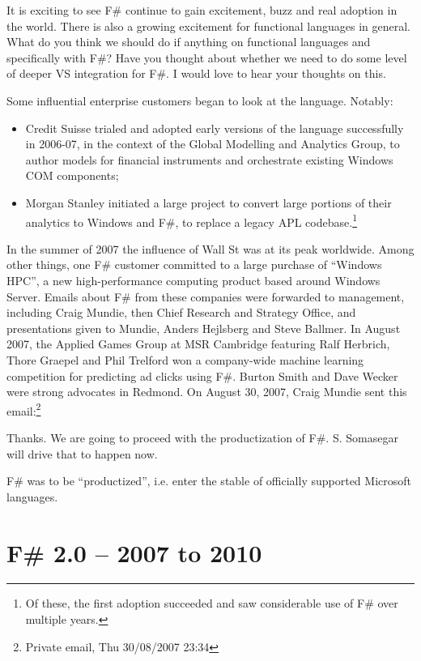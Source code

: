 \documentclass[acmsmall]{acmart}\settopmatter{}
\begin{document}
\begin{verbquote}
It is exciting to see F# continue to gain excitement, buzz and real adoption in the world. There is also a growing
excitement for functional languages in general. What do you think we should do if anything on functional languages
and specifically with F#?  Have you thought about whether we need to do some level of deeper VS integration for F#.  I would love to hear your thoughts on this.
\end{verbquote}
Some influential enterprise customers began to look at the language.  Notably:

\begin{itemize}
\item Credit Suisse trialed and adopted early versions of the language successfully in 2006-07, in the context
of the Global Modelling and Analytics Group, to author models for financial instruments and orchestrate existing Windows COM components;
\item Morgan Stanley initiated a large project to convert large portions of their analytics to Windows and F\#, to
replace a legacy APL codebase.\footnote{Of these, the first adoption succeeded and saw considerable use of F\# over multiple years.}
\end{itemize}

In the summer of 2007 the influence of Wall St was at its peak worldwide. Among other things, one F\# customer
committed to a large purchase of “Windows HPC”, a new high-performance computing product based around
Windows Server. Emails about F\# from these companies were forwarded to management, including Craig Mundie,
then Chief Research and Strategy Office, and presentations given to Mundie, Anders Hejlsberg and Steve Ballmer.
In August 2007, the Applied Games Group at MSR Cambridge featuring Ralf Herbrich, Thore Graepel and Phil
Trelford won a company-wide machine learning competition for predicting ad clicks using F\#.  Burton Smith and
Dave Wecker were strong advocates in Redmond. On August 30, 2007, Craig Mundie sent this email:\footnote{Private email, Thu 30/08/2007 23:34}
\begin{verbquote}
Thanks.  We are going to proceed with the productization of F#.  S. Somasegar will drive that to happen now.
\end{verbquote}
F\# was to be “productized”, i.e. enter the stable of officially supported Microsoft languages.

\section*{F\# 2.0 – 2007 to 2010}
\end{document}
